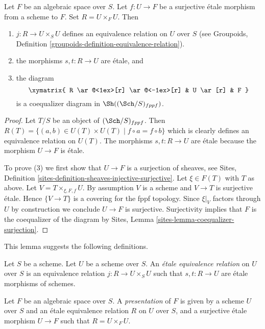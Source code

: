 \begin{lemma}
\label{lemma-space-presentation}
Let $F$ be an algebraic space over $S$. Let $f : U \to F$ be a
surjective \'etale morphism from a scheme to $F$. Set $R = U \times_F U$.
Then
\begin{enumerate}
\item $j : R \to U \times_S U$ defines an equivalence relation on
$U$ over $S$ (see
Groupoids, Definition \ref{groupoids-definition-equivalence-relation}).
\item the morphisms $s, t : R \to U$ are \'etale, and
\item the diagram
$$
\xymatrix{
R \ar@<1ex>[r] \ar@<-1ex>[r] &
U \ar[r] &
F
}
$$
is a coequalizer diagram in $\Sh((\Sch/S)_{fppf})$.
\end{enumerate}
\end{lemma}

\begin{proof}
Let $T/S$ be an object of $(\Sch/S)_{fppf}$.
Then $R(T) = \{(a, b) \in U(T) \times U(T) \mid f \circ a = f \circ b\}$
which is clearly defines an equivalence relation on $U(T)$.
The morphisms $s, t : R \to U$ are \'etale because the morphism
$U \to F$ is \'etale.

\medskip\noindent
To prove (3) we first show that
$U \to F$ is a surjection of sheaves, see
Sites, Definition \ref{sites-definition-sheaves-injective-surjective}.
Let $\xi \in F(T)$ with $T$ as above. Let $V = T \times_{\xi, F, f}U$.
By assumption $V$ is a scheme and $V \to T$ is surjective \'etale.
Hence $\{V \to T\}$ is a covering for the fppf topology.
Since $\xi|_V$ factors through $U$ by construction we
conclude $U \to F$ is surjective. Surjectivity implies that
$F$ is the coequalizer of the diagram by
Sites, Lemma \ref{sites-lemma-coequalizer-surjection}.
\end{proof}

\noindent
This lemma suggests the following definitions.

\begin{definition}
\label{definition-etale-equivalence-relation}
Let $S$ be a scheme. Let $U$ be a scheme over $S$.
An {\it \'etale equivalence relation} on $U$ over $S$
is an equivalence relation $j : R \to U \times_S U$
such that $s, t : R \to U$ are \'etale morphisms of schemes.
\end{definition}

\begin{definition}
\label{definition-presentation}
Let $F$ be an algebraic space over $S$.
A {\it presentation} of $F$ is given by a scheme
$U$ over $S$ and an \'etale equivalence relation $R$ on $U$ over $S$, and
a surjective \'etale morphism $U \to F$ such that $R = U \times_F U$.
\end{definition}

